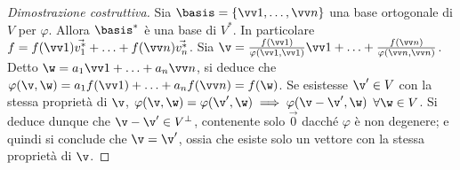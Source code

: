 \begin{proof}[Dimostrazione costruttiva]
	Sia $\basis = \{ \vv 1, \ldots, \vv n \}$ una base ortogonale di $V$ per $\varphi$. Allora $\basis^*$ è una base di $V^*$. In
	particolare $f = f(\vv 1) \vec{v_1^*} + \ldots + f(\vv n) \vec{v_n^*}$. Sia $\v = \frac{f(\vv 1)}{\varphi(\vv 1, \vv 1)} \vv 1 + \ldots + \frac{f(\vv n)}{\varphi(\vv n, \vv n)}$. Detto $\w = a_1 \vv 1 + \ldots + a_n \vv n$,
	si deduce che $\varphi(\v, \w) = a_1 f(\vv 1) + \ldots + a_n f(\vv n) = f(\w)$. Se esistesse $\v' \in V$ con
	la stessa proprietà di $\v$, $\varphi(\v, \w) = \varphi(\v', \w) \implies \varphi(\v - \v', \w)$ $\forall \w \in V$. Si deduce dunque che $\v - \v' \in V^\perp$, contenente solo $\vec 0$ dacché $\varphi$ è non degenere;
	e quindi si conclude che $\v = \v'$, ossia che esiste solo un vettore con la stessa proprietà di $\v$.
\end{proof}
